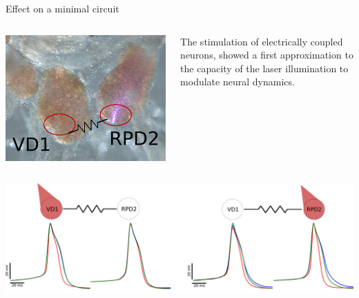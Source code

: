 \documentclass[aspectratio=43]{beamer}
\begin{document}
\begin{frame}{Effect on a minimal circuit}
	
	\begin{columns}
		\begin{column}{0.3\textwidth}
			\includegraphics[width=\textwidth]{Images/electrical_ganglia.png}
		\end{column}
	\vspace{15pt}
		\begin{column}{0.7\textwidth}
			The stimulation of electrically coupled neurons, showed a first approximation to the capacity of the laser illumination to modulate neural dynamics. 
		\end{column}
	\end{columns}
	\vspace{10pt}
	\centering
	\includegraphics[width=\textwidth]{Images/electrical_result.png}	
\end{frame}
\end{document}
